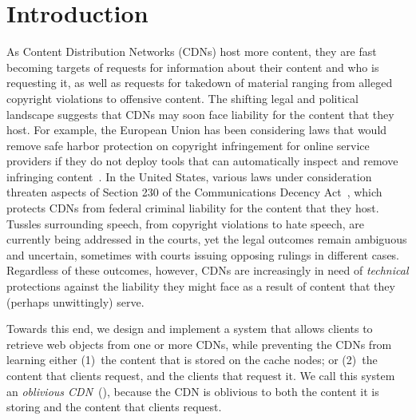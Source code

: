 \section{Introduction}
\label{sec:intro}


As Content Distribution Networks (CDNs) host more content,
they are fast becoming targets of requests for information about their content
and who is requesting it, as well as requests for takedown of material ranging
from alleged copyright violations to offensive content. The shifting legal and
political landscape suggests that CDNs may soon face liability for the content
that they host. For example, the European Union has been considering laws that
would remove safe harbor protection on copyright infringement for online
service providers if they do not deploy tools that can automatically inspect
and remove infringing content~\cite{eu-copyright}. In the United States,
various laws under consideration threaten aspects of Section 230 of the
Communications Decency Act~\cite{sec230}, which protects CDNs from federal
criminal liability for the content that they host. Tussles surrounding speech,
from copyright violations to hate speech, are currently being addressed in the
courts, yet the legal outcomes remain ambiguous and uncertain, sometimes with
courts issuing opposing rulings in different cases. Regardless of these
outcomes, however, CDNs are increasingly in need of {\em technical}
protections against the liability they might face as a result of content that
they (perhaps unwittingly) serve.

Towards this end, we design and implement a system that allows clients to
retrieve web objects from one or more CDNs, while preventing the CDNs from
learning either (1)~the content that is stored on the cache nodes; or (2)~the content
that clients request, and the clients that request it. We call this system an {\em
oblivious
CDN}~(\system{}), because the CDN is oblivious to both the content it is
storing and the content that clients request.

